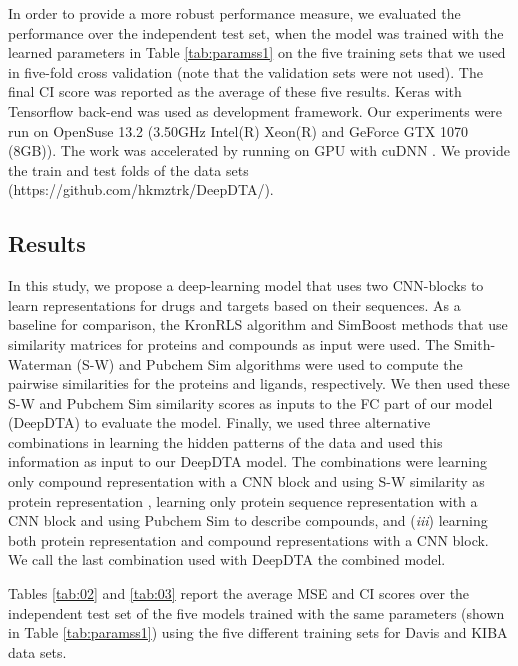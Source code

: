 \documentclass[11pt,letterpaper]{article}
\begin{document}
In order to provide a more robust performance measure, we evaluated the performance over the independent test set, when the model was trained with the learned parameters in Table \ref{tab:paramss1} on the five training sets that we used in five-fold cross validation (note that the validation sets were not used).  The final CI score was reported as the average of these five results. Keras \cite{chollet2015keras} with Tensorflow \cite{abadi2016tensorflow} back-end was used as development framework. Our experiments were run on OpenSuse 13.2 (3.50GHz  Intel(R) Xeon(R) and GeForce GTX 1070  (8GB)). The work was accelerated by running on GPU with cuDNN \cite{chetlur2014cudnn}. We provide the train and test folds of the data sets (https://github.com/hkmztrk/DeepDTA/).

\subsection*{Results}

In this study, we propose a deep-learning model that uses two CNN-blocks to learn representations for drugs and targets based on their sequences. As a baseline for comparison, the KronRLS algorithm and SimBoost methods that use similarity matrices for proteins and compounds as input were used. The Smith-Waterman (S-W) and Pubchem Sim algorithms were used to compute the pairwise similarities for the proteins and ligands, respectively.  We then used these S-W and Pubchem Sim similarity scores as inputs to the FC part of our model (DeepDTA) to evaluate the model. Finally, we  used three alternative combinations in learning the hidden patterns of the data and used this information as input to our DeepDTA model. The combinations were  learning only compound representation with a CNN block and using S-W similarity as protein representation ,  learning only protein sequence representation with a CNN block and using Pubchem Sim to describe compounds, and (\textit{iii}) learning both protein representation and compound representations with a CNN block. We call the last combination used with DeepDTA the combined model.

Tables \ref{tab:02} and \ref{tab:03} report the average MSE and CI scores over the independent test set of the five models trained with the same parameters (shown in Table \ref{tab:paramss1}) using the five different training sets for Davis and KIBA data sets. 
\end{document}
